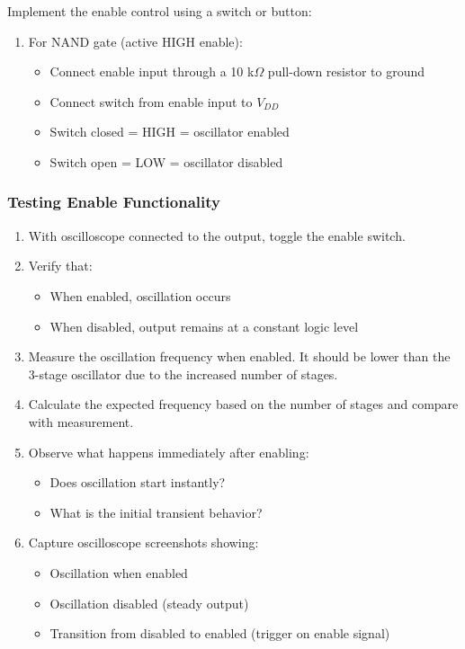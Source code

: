 \documentclass[10pt]{article}
\begin{document}
Implement the enable control using a switch or button:

\begin{enumerate}
    \item For NAND gate (active HIGH enable):
    \begin{itemize}
        \item Connect enable input through a 10 k$\Omega$ pull-down resistor to ground
        \item Connect switch from enable input to $V_{DD}$
        \item Switch closed = HIGH = oscillator enabled
        \item Switch open = LOW = oscillator disabled
    \end{itemize}
    
\end{enumerate}

\subsubsection{Testing Enable Functionality}

\begin{enumerate}
    \item With oscilloscope connected to the output, toggle the enable switch. 
    
    \item Verify that: 
    \begin{itemize}
        \item When enabled, oscillation occurs
        \item When disabled, output remains at a constant logic level
    \end{itemize}
    
    \item Measure the oscillation frequency when enabled.  It should be lower than the 3-stage oscillator due to the increased number of stages.
    
    \item Calculate the expected frequency based on the number of stages and compare with measurement.
    
    \item Observe what happens immediately after enabling: 
    \begin{itemize}
        \item Does oscillation start instantly?
        \item What is the initial transient behavior?
    \end{itemize}
    
    \item Capture oscilloscope screenshots showing: 
    \begin{itemize}
        \item Oscillation when enabled
        \item Oscillation disabled (steady output)
        \item Transition from disabled to enabled (trigger on enable signal)
    \end{itemize}
\end{enumerate}
\end{document}

